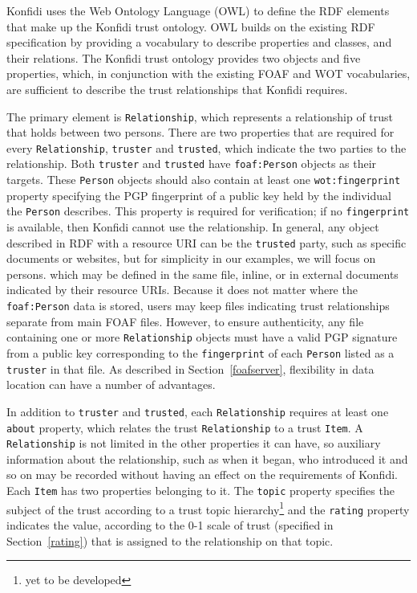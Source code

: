 \documentclass[letterpaper]{www2006-submission}
\begin{document}
Konfidi uses the Web Ontology Language (OWL) \citep{owl} to define the RDF elements that make up the Konfidi trust ontology.  OWL builds on the existing RDF specification by providing a vocabulary to describe properties and classes, and their relations.  The Konfidi trust ontology provides two objects and five properties, which, in conjunction with the existing FOAF and WOT vocabularies, are sufficient to describe the trust relationships that Konfidi requires.

The primary element is \texttt{Re\-la\-tion\-ship}, which represents a relationship of trust that holds between two persons.  There are two properties that are required for every \texttt{Re\-la\-tion\-ship}, \texttt{trust\-er} and \texttt{trust\-ed}, which indicate the two parties to the relationship.  Both \texttt{trust\-er} and \texttt{trust\-ed} have \texttt{foaf:\-Per\-son} objects as their targets.  These \texttt{Per\-son} objects should also contain at least one \texttt{wot:\-fin\-ger\-print} property specifying the PGP fingerprint of a public key held by the individual the \texttt{Per\-son} describes.  This property is required for verification; if no \texttt{fin\-ger\-print} is available, then Konfidi cannot use the relationship.  In general, any object described in RDF with a resource URI can be the \texttt{trust\-ed} party, such as specific documents or websites, but for simplicity in our examples, we will focus on persons. which may be defined in the same file, inline, or in external documents indicated by their resource URIs.  Because it does not matter where the \texttt{foaf:\-Per\-son} data is stored, users may keep files indicating trust relationships separate from main FOAF files.  However, to ensure authenticity, any file containing one or more \texttt{Re\-la\-tion\-ship} objects must have a valid PGP signature from a public key corresponding to the \texttt{fin\-ger\-print} of each \texttt{Per\-son} listed as a \texttt{trust\-er} in that file.  As described in Section~\ref{foafserver}, flexibility in data location can have a number of advantages.  

In addition to \texttt{truster} and \texttt{trusted}, each \texttt{Relationship} requires at least one \texttt{about} property, which relates the trust \texttt{Re\-la\-tion\-ship} to a trust \texttt{Item}.  A \texttt{Re\-la\-tion\-ship} is not limited in the other properties it can have, so auxiliary information about the relationship, such as when it began, who introduced it and so on may be recorded without having an effect on the requirements of Konfidi.  Each \texttt{Item} has two properties belonging to it.  The \texttt{topic} property specifies the subject of the trust according to a trust topic hierarchy\footnote{yet to be developed} and the \texttt{rating} property indicates the value, according to the 0-1 scale of trust (specified in Section~\ref{rating}) that is assigned to the relationship on that topic.  
\end{document}
